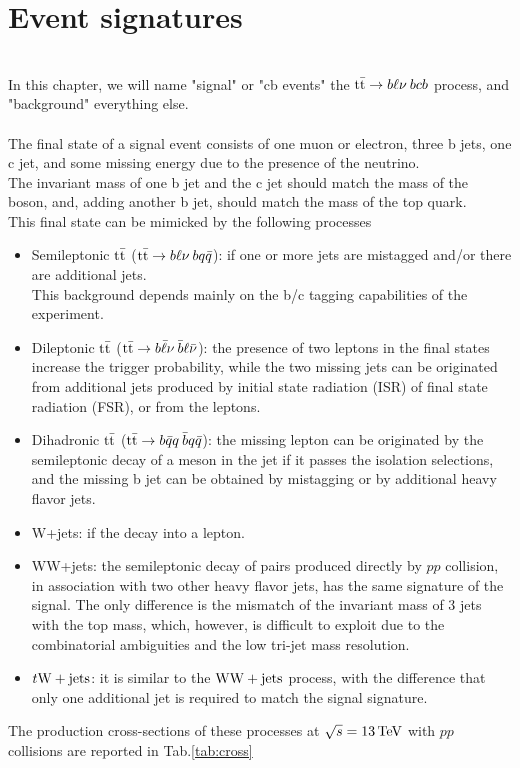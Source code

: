 \section{Event signatures}
\\
In this chapter, we will name "signal" or "cb events" the ${{\text{t}}{\bar{\text{t}}}} \to b\ell\nu\: bcb$ process, and "background" everything else.\\
\\
The final state of a signal event consists of one muon or electron, three b jets, one c jet, and some missing energy due to the presence of the neutrino.\\
The invariant mass of one b jet and the c jet should match the mass of the \PW boson, and, adding another b jet, should match the mass of the top quark.\\
This final state can be mimicked by the following processes 
\begin{itemize}
    \item Semileptonic ${{\text{t}}{\bar{\text{t}}}}$ (${{\text{t}}{\bar{\text{t}}}}\to b\ell\nu \: bq\bar{q}$): if one or more jets are mistagged and/or there are additional jets.\\
    This background depends mainly on the b/c tagging capabilities of the experiment.
    \item Dileptonic ${{\text{t}}{\bar{\text{t}}}}$ (${{\text{t}}{\bar{\text{t}}}} \to b\bar{\ell}\nu \: \bar{b}\ell\bar{\nu}$): the presence of two leptons in the final states increase the trigger probability, while the two missing jets can be originated from additional jets produced by initial state radiation (ISR) of final state radiation (FSR), or from the leptons.
    \item Dihadronic ${{\text{t}}{\bar{\text{t}}}}$ (${{\text{t}}{\bar{\text{t}}}} \to b\bar{q}q \: \bar{b}q\bar{q}$): the missing lepton can be originated by the semileptonic decay of a meson in the jet if it passes the isolation selections, and the missing b jet can be obtained by mistagging or by additional heavy flavor jets.
    \item W+jets: if the \PW decay into a lepton.
    \item WW+jets: the semileptonic decay of \PW pairs produced directly by $pp$ collision, in association with two other heavy flavor jets, has the same signature of the signal. The only difference is the mismatch of the invariant mass of 3 jets with the top mass, which, however, is difficult to exploit due to the combinatorial ambiguities and the low tri-jet mass resolution.  
    \item $t{\text{W}}+\text{jets}$: it is similar to the ${\text{W}} {\text{W}} + \text{jets}$ process, with the difference that only one additional jet is required to match the signal signature.
\end{itemize}
The production cross-sections of these processes  at $\sqrt{s}=13{\,\text{Te\hspace{-.08em}V}}$ with $pp$ collisions are reported in Tab.\ref{tab:cross}


